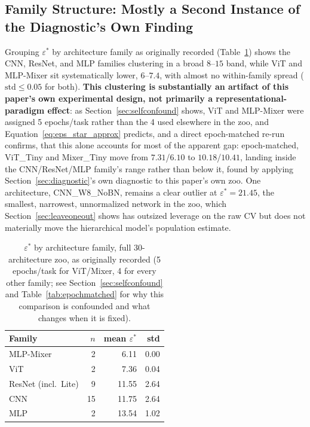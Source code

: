 \documentclass[11pt]{article}
\newcommand{\eps}{\varepsilon}
\newcommand{\epsstar}{\eps^{*}}
\begin{document}
\subsection{Family Structure: Mostly a Second Instance of the Diagnostic's
Own Finding}
\label{sec:familystructure}
Grouping $\epsstar$ by architecture family as originally recorded
(Table~\ref{tab:family}) shows the CNN, ResNet, and MLP families clustering
in a broad $8$--$15$ band, while ViT and MLP-Mixer sit systematically
lower, $6$--$7.4$, with almost no within-family spread ($\text{std}\le0.05$
for both). \textbf{This clustering is substantially an artifact of this
paper's own experimental design, not primarily a representational-paradigm effect}: as
Section~\ref{sec:selfconfound} shows, ViT and MLP-Mixer were assigned 5
epochs/task rather than the 4 used elsewhere in the zoo, and
Equation~\ref{eq:eps_star_approx} predicts, and a direct epoch-matched
re-run confirms, that this alone accounts for most of the apparent gap:
epoch-matched, ViT\_Tiny and Mixer\_Tiny move from $7.31$/$6.10$ to
$10.18$/$10.41$, landing inside the CNN/ResNet/MLP family's range rather
than below it, found by applying Section~\ref{sec:diagnostic}'s own
diagnostic to this paper's own zoo. One
architecture, CNN\_W8\_NoBN, remains a clear outlier at $\epsstar=21.45$,
the smallest, narrowest, unnormalized network in the zoo, which
Section~\ref{sec:leaveoneout} shows has outsized leverage on the raw CV but
does not materially move the hierarchical model's population estimate.

\begin{table}[h]
\centering
\caption{$\epsstar$ by architecture family, full 30-architecture zoo, as
originally recorded (5 epochs/task for ViT/Mixer, 4 for every other
family; see Section~\ref{sec:selfconfound} and Table~\ref{tab:epochmatched}
for why this comparison is confounded and what changes when it is fixed).}
\label{tab:family}
\begin{tabular}{lrrr}
\toprule
Family & $n$ & mean $\epsstar$ & std \\
\midrule
MLP-Mixer & 2  & 6.11  & 0.00 \\
ViT       & 2  & 7.36  & 0.04 \\
ResNet (incl.\ Lite) & 9 & 11.55 & 2.64 \\
CNN       & 15 & 11.75 & 2.64 \\
MLP       & 2  & 13.54 & 1.02 \\
\bottomrule
\end{tabular}
\end{table}
\end{document}
